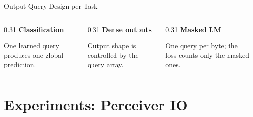 \documentclass[aspectratio=169,11pt]{beamer}
\newcommand{\colhead}[1]{{\color{HeadBlue}\bfseries #1}\par\vspace{0.25em}}
\begin{document}
\begin{frame}[shrink=4]{Output Query Design per Task}
  \vspace{0.2em}
  \begin{columns}[T,onlytextwidth]
    \begin{column}{0.31\textwidth}
      \colhead{Classification}
        \scriptsize One learned query produces one global prediction.
      
    \end{column}
    \begin{column}{0.31\textwidth}
      \colhead{Dense outputs}
        \scriptsize Output shape is controlled by the query array.
      
    \end{column}
    \begin{column}{0.31\textwidth}
      \colhead{Masked LM}
        \scriptsize One query per byte; the loss counts only the masked ones.
      
    \end{column}
  \end{columns}
\end{frame}



\section{Experiments: Perceiver IO}
\end{document}
